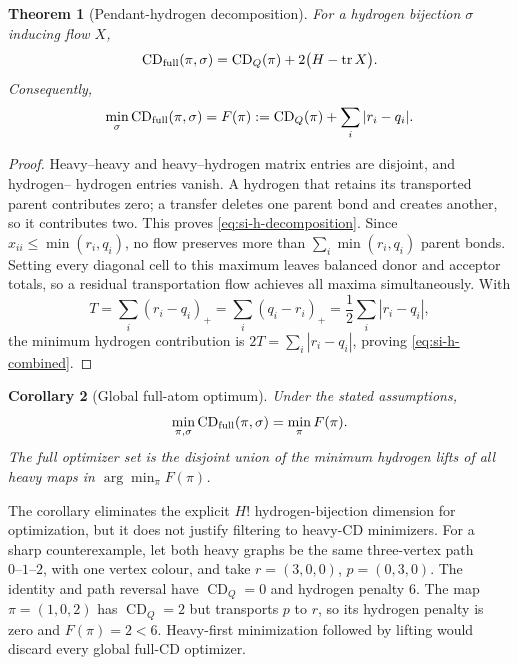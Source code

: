 \documentclass[11pt]{article}
\newtheorem{theorem}{Theorem}[section]
\newtheorem{corollary}[theorem]{Corollary}
\theoremstyle{definition}
\newcommand{\CD}{\operatorname{CD}}
\begin{document}
\begin{theorem}[Pendant-hydrogen decomposition]
For a hydrogen bijection \(\sigma\) inducing flow \(X\),
\begin{equation}
 \CD_{\rm full}(\pi,\sigma)
 =\CD_Q(\pi)+2\bigl(H-\operatorname{tr}X\bigr).
 \label{eq:si-h-decomposition}
\end{equation}
Consequently,
\begin{equation}
 \min_{\sigma}\CD_{\rm full}(\pi,\sigma)
 =F(\pi):=\CD_Q(\pi)+\sum_i|r_i-q_i|.
 \label{eq:si-h-combined}
\end{equation}
\end{theorem}

\begin{proof}
Heavy--heavy and heavy--hydrogen matrix entries are disjoint, and hydrogen--
hydrogen entries vanish.  A hydrogen that retains its transported parent
contributes zero; a transfer deletes one parent bond and creates another, so
it contributes two.  This proves \cref{eq:si-h-decomposition}.  Since
\(x_{ii}\leq\min(r_i,q_i)\), no flow preserves more than
\(\sum_i\min(r_i,q_i)\) parent bonds.  Setting every diagonal cell to this
maximum leaves balanced donor and acceptor totals, so a residual transportation
flow achieves all maxima simultaneously.  With
\[
 T=\sum_i(r_i-q_i)_+=\sum_i(q_i-r_i)_+
   =\frac12\sum_i|r_i-q_i|,
\]
the minimum hydrogen contribution is \(2T=\sum_i|r_i-q_i|\), proving
\cref{eq:si-h-combined}.
\end{proof}

\begin{corollary}[Global full-atom optimum]
Under the stated assumptions,
\[
 \min_{\pi,\sigma}\CD_{\rm full}(\pi,\sigma)=\min_\pi F(\pi).
\]
The full optimizer set is the disjoint union of the minimum hydrogen lifts of
all heavy maps in \(\arg\min_\pi F(\pi)\).
\end{corollary}

The corollary eliminates the explicit \(H!\) hydrogen-bijection dimension for
optimization, but it does not justify filtering to heavy-CD minimizers.  For a
sharp counterexample, let both heavy graphs be the same three-vertex path
\(0\text{--}1\text{--}2\), with one vertex colour, and take
\(r=(3,0,0)\), \(p=(0,3,0)\).  The identity and path reversal have
\(\CD_Q=0\) and hydrogen penalty 6.  The map
\(\pi=(1,0,2)\) has \(\CD_Q=2\) but transports \(p\) to \(r\), so its
hydrogen penalty is zero and \(F(\pi)=2<6\).  Heavy-first minimization followed
by lifting would discard every global full-CD optimizer.
\end{document}
